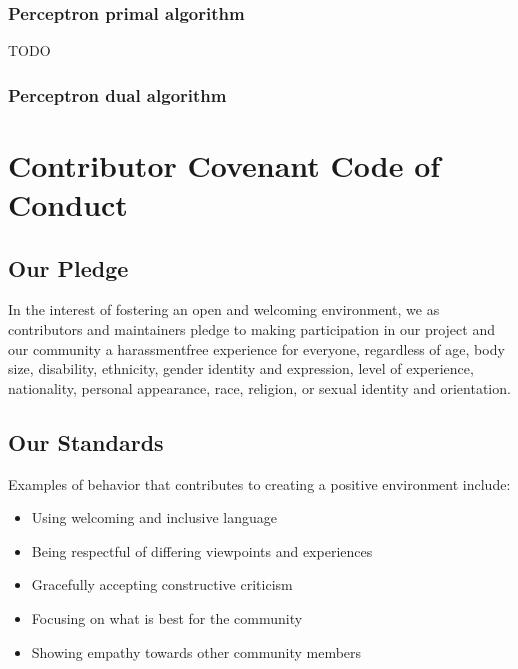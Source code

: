 \documentclass[letterpaper,10pt,english]{sphinxmanual}
\begin{document}
\subsection{Perceptron primal algorithm}
\label{\detokenize{contribute/extending:perceptron-primal-algorithm}}
\sphinxAtStartPar
TODO


\subsection{Perceptron dual algorithm}
\label{\detokenize{contribute/extending:perceptron-dual-algorithm}}

\chapter{Contributor Covenant Code of Conduct}
\label{\detokenize{contribute/codeconduct:contributor-covenant-code-of-conduct}}\label{\detokenize{contribute/codeconduct::doc}}

\section{Our Pledge}
\label{\detokenize{contribute/codeconduct:our-pledge}}
\sphinxAtStartPar
In the interest of fostering an open and welcoming environment, we as contributors and maintainers pledge to making participation in our project and our community a harassment\sphinxhyphen{}free experience for everyone, regardless of age, body size, disability, ethnicity, gender identity and expression, level of experience, nationality, personal appearance, race, religion, or sexual identity and orientation.


\section{Our Standards}
\label{\detokenize{contribute/codeconduct:our-standards}}
\sphinxAtStartPar
Examples of behavior that contributes to creating a positive environment include:
\begin{itemize}
\item {} 
\sphinxAtStartPar
Using welcoming and inclusive language

\item {} 
\sphinxAtStartPar
Being respectful of differing viewpoints and experiences

\item {} 
\sphinxAtStartPar
Gracefully accepting constructive criticism

\item {} 
\sphinxAtStartPar
Focusing on what is best for the community

\item {} 
\sphinxAtStartPar
Showing empathy towards other community members

\end{itemize}
\end{document}
